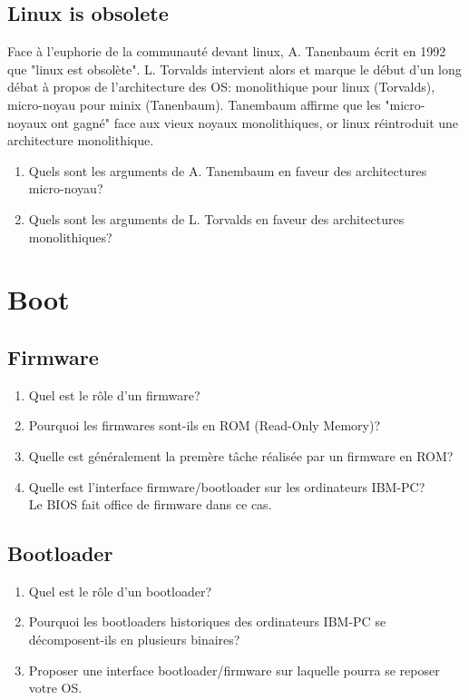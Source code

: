 \subsection{Linux is obsolete}

Face à l'euphorie de la communauté devant linux, A. Tanenbaum écrit en 1992 que "linux est obsolète". L. Torvalds intervient alors et marque le début d'un long débat à propos de l'architecture des OS: monolithique pour linux (Torvalds), micro-noyau pour minix (Tanenbaum). Tanembaum affirme que les "micro-noyaux ont gagné" face aux vieux noyaux monolithiques, or linux réintroduit une architecture monolithique.

\begin{enumerate}
\item Quels sont les arguments de A. Tanembaum en faveur des architectures micro-noyau?
\item Quels sont les arguments de L. Torvalds en faveur des architectures monolithiques?
\end{enumerate}

%
%

\section{{Boot}
         {\hfill{} }}

\subsection{Firmware}

\begin{enumerate}
\item Quel est le rôle d'un firmware?
\item Pourquoi les firmwares sont-ils en ROM (Read-Only Memory)?
\item Quelle est généralement la premère tâche réalisée par un firmware en ROM?
\item Quelle est l'interface firmware/bootloader sur les ordinateurs IBM-PC?\\
      Le BIOS fait office de firmware dans ce cas.
\end{enumerate}

\subsection{Bootloader}
\begin{enumerate}
\item Quel est le rôle d'un bootloader?
\item Pourquoi les bootloaders historiques des ordinateurs IBM-PC se décomposent-ils en plusieurs binaires?
\item Proposer une interface bootloader/firmware sur laquelle pourra se reposer votre OS.
\end{enumerate}

